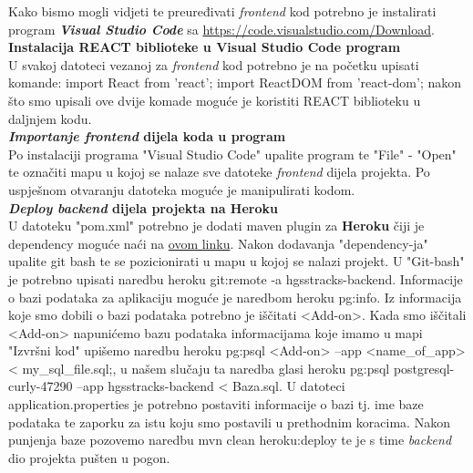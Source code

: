 			 {Kako bismo mogli vidjeti te preuređivati \textit{frontend} kod potrebno je instalirati program \textit{\textbf{Visual Studio Code}} sa \href{https://code.visualstudio.com/Download}{https://code.visualstudio.com/Download}.}\\
			 
			 \textbf{Instalacija REACT biblioteke u Visual Studio Code program}\\
			 
			 {U svakoj datoteci vezanoj za \textit{frontend} kod potrebno je na početku upisati komande: 
			 import React from 'react';
		 	 import ReactDOM from 'react-dom';
	 	 	 nakon što smo upisali ove dvije komade moguće je koristiti REACT biblioteku u daljnjem kodu.}\\
			
			\textbf{\textit{Importanje frontend} dijela koda u program}\\
			
			{Po instalaciji programa "Visual Studio Code" upalite program te "File" - "Open" te označiti mapu u kojoj se nalaze sve datoteke \textit{frontend} dijela projekta. Po uspješnom otvaranju datoteka moguće je manipulirati kodom.}\\
			
			\textbf{\textit{Deploy backend} dijela projekta na Heroku}\\
			
			{U datoteku "pom.xml" potrebno je dodati maven plugin za \textbf{Heroku} čiji je dependency moguće naći na \href{https://elements.heroku.com/buildpacks/heroku/heroku-maven-plugin}{ovom linku}. Nakon dodavanja "dependency-ja" upalite git bash te se pozicionirati u mapu u kojoj se nalazi projekt. U "Git-bash" je potrebno upisati naredbu heroku git:remote -a hgsstracks-backend. Informacije o bazi podataka za aplikaciju moguće je naredbom heroku pg:info. Iz informacija koje smo dobili o bazi podataka potrebno je iščitati <Add-on>. Kada smo iščitali <Add-on> napunićemo bazu podataka informacijama koje imamo u mapi "Izvršni kod" upišemo naredbu heroku pg:psql <Add-on> --app <name\_of\_app> < my\_sql\_file.sql;, u našem slučaju ta naredba glasi heroku pg:psql postgresql-curly-47290 --app hgsstracks-backend < Baza.sql. U datoteci application.properties je potrebno postaviti informacije o bazi tj. ime baze podataka te zaporku za istu koju smo postavili u prethodnim koracima. Nakon punjenja baze pozovemo naredbu mvn clean heroku:deploy te je s time \textit{backend} dio projekta pušten u pogon.}\\
			
